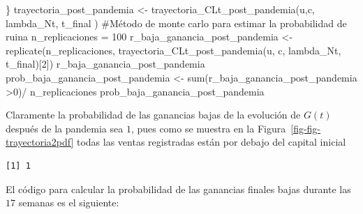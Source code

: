 \documentclass[
  us-letterpaper,
]{scrreprt}
\newenvironment{Shaded}{\begin{snugshade}}{\end{snugshade}}
\newcommand{\CommentTok}[1]{\textcolor[rgb]{0.37,0.37,0.37}{#1}}
\newcommand{\DecValTok}[1]{\textcolor[rgb]{0.68,0.00,0.00}{#1}}
\newcommand{\FunctionTok}[1]{\textcolor[rgb]{0.28,0.35,0.67}{#1}}
\newcommand{\NormalTok}[1]{\textcolor[rgb]{0.00,0.23,0.31}{#1}}
\newcommand{\OtherTok}[1]{\textcolor[rgb]{0.00,0.23,0.31}{#1}}
\newcommand{\SpecialCharTok}[1]{\textcolor[rgb]{0.37,0.37,0.37}{#1}}
\theoremstyle{plain}
\theoremstyle{plain}
\theoremstyle{definition}
\theoremstyle{remark}
\begin{document}
\begin{Shaded}
\begin{Highlighting}[]
\NormalTok{\}}
\NormalTok{trayectoria\_post\_pandemia }\OtherTok{\textless{}{-}} \FunctionTok{trayectoria\_CLt\_post\_pandemia}\NormalTok{(u,c,}
\NormalTok{                                            lambda\_Nt, t\_final )}
\CommentTok{\#Método de monte carlo para estimar la probabilidad de ruina}
\NormalTok{n\_replicaciones }\OtherTok{=} \DecValTok{100}
\NormalTok{r\_baja\_ganancia\_post\_pandemia }\OtherTok{\textless{}{-}} \FunctionTok{replicate}\NormalTok{(n\_replicaciones,}
                          \FunctionTok{trayectoria\_CLt\_post\_pandemia}\NormalTok{(u, c, }
\NormalTok{                                         lambda\_Nt, t\_final)[}\DecValTok{2}\NormalTok{])}
\NormalTok{r\_baja\_ganancia\_post\_pandemia }
\NormalTok{prob\_baja\_ganancia\_post\_pandemia }\OtherTok{\textless{}{-}} \FunctionTok{sum}\NormalTok{(r\_baja\_ganancia\_post\_pandemia }\SpecialCharTok{\textgreater{}}\DecValTok{0}\NormalTok{)}\SpecialCharTok{/}
\NormalTok{n\_replicaciones}
\NormalTok{prob\_baja\_ganancia\_post\_pandemia}
\end{Highlighting}
\end{Shaded}

Claramente la probabilidad de las ganancias bajas de la evolución de
\(G(t)\) después de la pandemia sea \(1\), pues como se muestra en la
Figura~\ref{fig-fig-trayectoria2pdf} todas las ventas registradas están
por debajo del capital inicial

\begin{verbatim}
[1] 1
\end{verbatim}

El código para calcular la probabilidad de las ganancias finales bajas
durante las \(17\) semanas es el siguiente:
\end{document}
